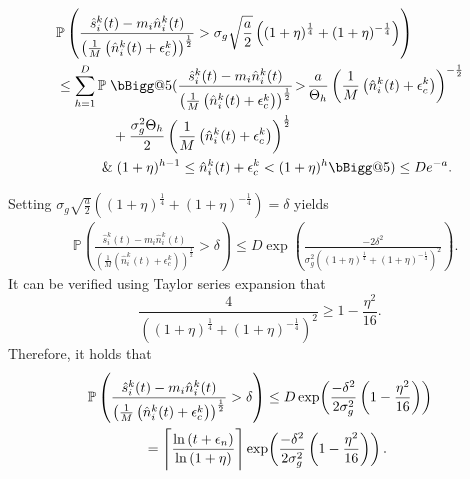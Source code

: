 \documentclass[final,5p,times,twocolumn]{elsarticle}
\makeatletter
\theoremstyle{definition}
\newcommand{\lnn}[1]{%
	\ln  \left(#1\right)%
}
\newcommand{\expp}[1]{%
	\exp \! \left(#1\right)%
}
\newcommand{\Vast}{\bBigg@{5}}
\makeatother
\begin{document}
	\begin{align*}
		&\mathbb{P} \left( \frac{\hat{s}_i^k(t) - m_i \hat{n}_i^k(t)}{\left(\frac{1}{M} \left(\hat{n}_i^k(t) + \epsilon_c^k\right)\right)^{\frac{1}{2}}} > \sigma_g \sqrt{\frac{a}{2}} \left( (1+\eta)^{\frac{1}{4}} + (1+\eta)^{-\frac{1}{4}}   \right)  \right) \\
		& \le \sum_{h=1}^D \mathbb{P}\; \Vast( \frac{\hat{s}_i^k(t) - m_i \hat{n}_i^k(t)}{\left(\frac{1}{M} \left(\hat{n}_i^k(t) + \epsilon_c^k\right)\right)^{\frac{1}{2}}} \! > \! \frac{a}{\Theta_h}\left(\frac{1}{M} \left(\hat{n}_i^k(t) + \epsilon_c^k\right)\right)^{-\frac{1}{2}}  \\
		&\qquad \qquad +\frac{ \sigma_g^2 \Theta_h}{2} \left(\frac{1}{M} \left(\hat{n}_i^k(t) + \epsilon_c^k\right)\right)^{\frac{1}{2}}\\
		&\qquad \quad   \; \&\;  (1+\eta)^{h-1} \le \hat n_i^k(t) + \epsilon_c^k< (1+\eta)^h   \Vast) \le D e^{-a}. 
	\end{align*}

	Setting $ \sigma_g \sqrt{\frac{a}{2}} \left( (1+\eta)^{\frac{1}{4}} + (1+\eta)^{-\frac{1}{4}} \right) = \delta$  yields 
	\begin{align*}
		&\mathbb{P} \left( \frac{\hat{s}_i^k(t) - m_i \hat{n}_i^k(t)}{\left(\frac{1}{M} \left(\hat{n}_i^k(t) + \epsilon_c^k\right)\right)^{\frac{1}{2}}} > \delta \right)  \leq D \expp{\frac{-2 \delta^2}{\sigma_g^2 \left( (1+\eta)^{\frac{1}{4}}\! +\! (1+\eta)^{-\frac{1}{4}} \right)^2 }}.
	\end{align*}
	{It can be verified using Taylor series expansion that} 
	\begin{equation*}
		\frac{4}{\left( (1+\eta)^{\frac{1}{4}} + (1+\eta)^{-\frac{1}{4}} \right)^2} \geq 1-\frac{\eta^2}{16}.
	\end{equation*}
	Therefore,	it holds that 
	\begin{align*}
		&\mathbb{P} \left( \frac{\hat{s}_i^k(t) - m_i \hat{n}_i^k(t)}{\left(\frac{1}{M} \left(\hat{n}_i^k(t) + \epsilon_c^k\right)\right)^{\frac{1}{2}}} > \delta \right) \leq D \expp{\frac{-\delta^2}{2\sigma_g^2}\left( 1-\frac{\eta^2}{16} \right) } \\
		& \qquad \qquad  = \Bigg\lceil \frac{\lnn{t + \epsilon_n}}{\lnn{1+\eta}} \Bigg\rceil  \expp{\frac{-\delta^2}{2\sigma_g^2}\left( 1-\frac{\eta^2}{16} \right) }.
	\end{align*}
	
\end{document}
